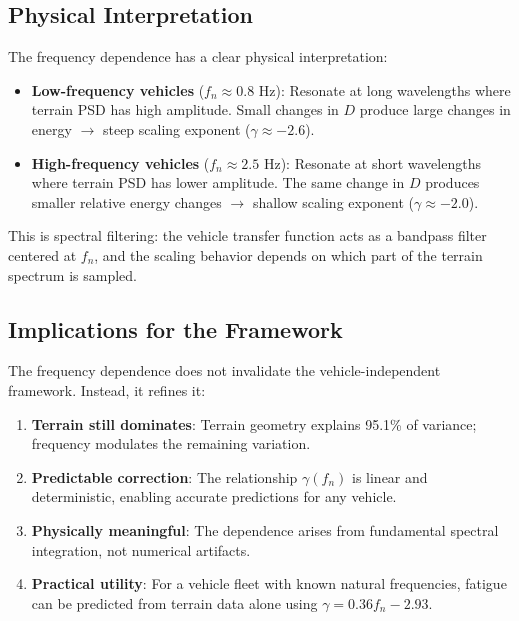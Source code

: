 \documentclass[11pt]{article}
\begin{document}
\subsection{Physical Interpretation}

The frequency dependence has a clear physical interpretation:

\begin{itemize}
\item \textbf{Low-frequency vehicles} ($f_n \approx 0.8$ Hz): Resonate at long wavelengths where terrain PSD has high amplitude. Small changes in $D$ produce large changes in energy $\rightarrow$ steep scaling exponent ($\gamma \approx -2.6$).

\item \textbf{High-frequency vehicles} ($f_n \approx 2.5$ Hz): Resonate at short wavelengths where terrain PSD has lower amplitude. The same change in $D$ produces smaller relative energy changes $\rightarrow$ shallow scaling exponent ($\gamma \approx -2.0$).
\end{itemize}

This is spectral filtering: the vehicle transfer function acts as a bandpass filter centered at $f_n$, and the scaling behavior depends on which part of the terrain spectrum is sampled.

\subsection{Implications for the Framework}

The frequency dependence does not invalidate the vehicle-independent framework. Instead, it refines it:

\begin{enumerate}
\item \textbf{Terrain still dominates}: Terrain geometry explains 95.1\% of variance; frequency modulates the remaining variation.

\item \textbf{Predictable correction}: The relationship $\gamma(f_n)$ is linear and deterministic, enabling accurate predictions for any vehicle.

\item \textbf{Physically meaningful}: The dependence arises from fundamental spectral integration, not numerical artifacts.

\item \textbf{Practical utility}: For a vehicle fleet with known natural frequencies, fatigue can be predicted from terrain data alone using $\gamma = 0.36 f_n - 2.93$.
\end{enumerate}
\end{document}
